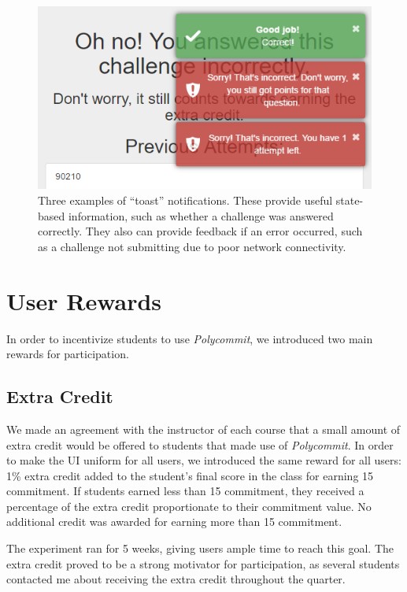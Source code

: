 \begin{figure}
	\includegraphics{figures/pc-toast}
	\caption{Three examples of ``toast'' notifications. These provide useful state-based information, such as whether a challenge was answered correctly. They also can provide feedback if an error occurred, such as a challenge not submitting due to poor network connectivity.}
	\label{fig:polycommit6}
\end{figure}

\section{User Rewards}

\par In order to incentivize students to use \textit{Polycommit}, we introduced two main rewards for participation.

\subsection{Extra Credit}

\par We made an agreement with the instructor of each course that a small amount of extra credit would be offered to students that made use of \textit{Polycommit}. In order to make the UI uniform for all users, we introduced the same reward for all users: 1\% extra credit added to the student's final score in the class for earning 15 commitment. If students earned less than 15 commitment, they received a percentage of the extra credit proportionate to their commitment value. No additional credit was awarded for earning more than 15 commitment.

\par The experiment ran for 5 weeks, giving users ample time to reach this goal. The extra credit proved to be a strong motivator for participation, as several students contacted me about receiving the extra credit throughout the quarter.

